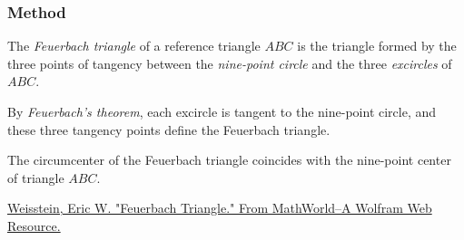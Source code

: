 \begin{minipage}{.55\textwidth}
  \begin{center}
  \end{center}
\end{minipage}
\begin{minipage}{.45\textwidth}
\begin{tkzexample}
\end{tkzexample}
\end{minipage}

\subsubsection{Method }
\label{ssub:method_triangle_feuerbach}

The \emph{Feuerbach triangle} of a reference triangle $ABC$ is the triangle formed by the three points of tangency between the \emph{nine-point circle} and the three \emph{excircles} of $ABC$.

By \emph{Feuerbach’s theorem}, each excircle is tangent to the nine-point circle, and these three tangency points define the Feuerbach triangle.

The circumcenter of the Feuerbach triangle coincides with the nine-point center of triangle $ABC$.
\begin{flushright}
  \small
\href{https://mathworld.wolfram.com/FeuerbachTriangle.html}{Weisstein, Eric W. "Feuerbach Triangle." From MathWorld--A Wolfram Web Resource.}
\end{flushright}

